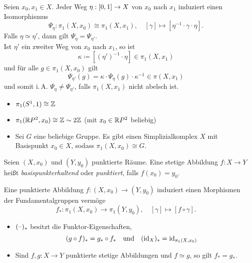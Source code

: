 \documentclass{cheat-sheet}
\begin{document}
\begin{prop}
  Seien $x_0, x_1 \in X$. Jeder Weg $\eta : \left[ 0, 1 \right] \to X$ von $x_0$ nach $x_1$ induziert einen Isomorphismus
  \[ \Psi_\eta : \pi_1(X, x_0) \cong \pi_1(X, x_1), \quad [\gamma] \mapsto [\eta^{-1} \cdot \gamma \cdot \eta]. \]
  Falls $\eta \simeq \eta'$, dann gilt $\Psi_\eta = \Psi_{\eta'}$.\\
  Ist $\eta'$ ein zweiter Weg von $x_0$ nach $x_1$, so ist
  \[ \kappa \coloneqq [(\eta')^{-1} \cdot \eta] \in \pi_1(X, x_1) \]
  und für alle $g \in \pi_1(X, x_0)$ gilt
  \[ \Psi_{\eta'}(g) = \kappa \cdot \Psi_{\eta}(g) \cdot \kappa^{-1} \in \pi(X, x_1) \]
  und somit i.\,A. $\Psi_\eta \not= \Psi_{\eta'}$, falls $\pi_1(X,x_1)$ nicht abelsch ist.
\end{prop}

\begin{bspe}
  \begin{itemize}
    \item $\pi_1(S^1, 1) \cong \mathbb{Z}$
    \item $\pi_1(\mathbb{R} P^2, x_0) \cong \mathbb{Z} \sim 2 \mathbb{Z}$ (mit $x_0 \in \mathbb{R} P^2$ beliebig)
    \item Sei $G$ eine beliebige Gruppe. Es gibt einen Simplizialkomplex $X$ mit Basispunkt $x_0 \in X$, sodass $\pi_1(X, x_0) \cong G$.
  \end{itemize}
\end{bspe}

\begin{defn}
  Seien $(X, x_0)$ und $(Y, y_0)$ punktierte Räume. Eine stetige Abbildung $f : X \to Y$ heißt \emph{basispunkterhaltend} oder \emph{punktiert}, falls $f(x_0) = y_0$.
\end{defn}

\begin{defn}
  Eine punktierte Abbildung $f : (X, x_0) \to (Y, y_0)$ induziert einen Morphismen der Fundamentalgruppen vermöge
  \[
    f_* : \pi_1(X, x_0) \to \pi_1(Y, y_0), \quad [\gamma] \mapsto [f \circ \gamma].
  \]
\end{defn}

\begin{prop}
  \begin{itemize}
    \item $(\text{--})_*$ besitzt die Funktor-Eigenschaften, \dh{}
    \[
      (g \circ f)_* = g_* \circ f_*
      \quad \text{und} \quad
      (\mathrm{id}_X)_* = \mathrm{id}_{\pi_1(X, x_0)}
    \]
    \item Sind $f, g : X \to Y$ punktierte stetige Abbildungen und $f \simeq g$, so gilt $f_* = g_*$.
  \end{itemize}
\end{prop}
\end{document}
